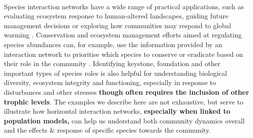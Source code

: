 \documentclass[a4,12pt]{article}
\begin{document}
\begin{refsection}

    \paragraph{}
    Species interaction networks have a wide range of practical applications, such as evaluating ecosystem response to human-altered landscapes, guiding future management decisions \parencite{Ross2011} or exploring how communities may respond to global warming \parencite{Gorman2019}. Conservation and ecosystem management efforts aimed at regulating species abundances can, for example, use the information provided by an interaction network to prioritise which species to conserve or eradicate based on their role in the community \parencite{Cirtwill2018a}. Identifying keystone, foundation and other important types of species roles is also helpful for understanding biological diversity, ecosystem integrity and functioning, especially in response to disturbances and other stresses \parencite{Nyakatya2008, Orwin2016, Losapio2017, Narwani2019} \textbf{though often requires the inclusion of other trophic levels}. The examples we describe here are not exhaustive, but serve to illustrate how horizontal interaction networks, \textbf{especially when linked to population models,} can help us understand both community dynamics overall and the effects \& response of specific species towards the community. 


\end{refsection}
\end{document}
